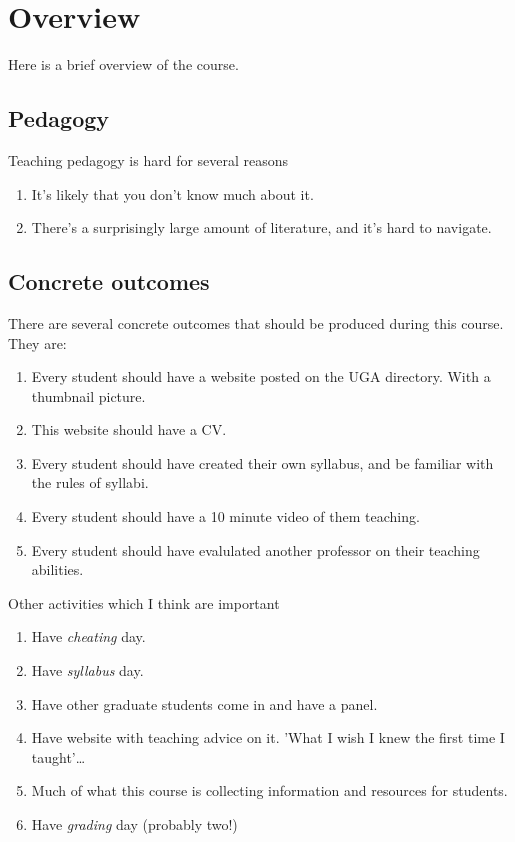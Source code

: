 \section{Overview}

Here is a brief overview of the course.

\subsection{Pedagogy}
\label{sec:pedagogy}

Teaching pedagogy is hard for several reasons

\begin{enumerate}
\item It's likely that you don't know much about it.
\item There's a surprisingly large amount of literature, and it's hard to navigate.
\end{enumerate}

\subsection{Concrete outcomes}
\label{sec:concrete-outcomes}

There are several concrete outcomes that should be produced during this course.  They are:

\begin{enumerate}
\item Every student should have a website posted on the UGA directory.  With a thumbnail picture.
\item This website should have a CV.
\item Every student should have created their own syllabus, and be familiar with the rules of syllabi.
\item Every student should have a 10 minute video of them teaching.
\item Every student should have evalulated another professor on their teaching abilities.
\end{enumerate}

Other activities which I think are important

\begin{enumerate}
\item Have \emph{cheating} day.
\item Have \emph{syllabus} day.
\item Have other graduate students come in and have a panel.
\item Have website with teaching advice on it.  'What I wish I knew the first time I taught'\ldots
\item Much of what this course is collecting information and resources for students.
\item Have \emph{grading} day (probably two!)
\end{enumerate}

